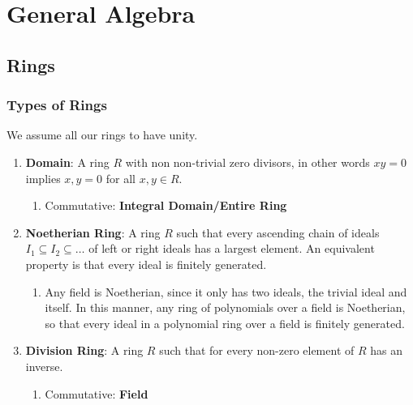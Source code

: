 \documentclass{report}
\begin{document}
  \chapter{General Algebra}
  \section{Rings}
  \subsection{Types of Rings}
  We assume all our rings to have unity.
  \begin{enumerate}
  \item[] \textbf{Domain}: A ring $R$ with non non-trivial zero divisors, in other words $xy=0$ implies $x,y=0$ for all $x,y\in R$.
    \begin{enumerate}
    \item[] Commutative: \textbf{Integral Domain/Entire Ring}
    \end{enumerate}

  \item[] \textbf{Noetherian Ring}: A ring $R$ such that every ascending chain of ideals $I_1\subseteq I_2\subseteq\ldots$ of left or right ideals has a largest element. An equivalent property is that every ideal is finitely generated.
    \begin{enumerate}
    \item Any field is Noetherian, since it only has two ideals, the trivial ideal and itself. In this manner, any ring of polynomials over a field is Noetherian, so that every ideal in a polynomial ring over a field is finitely generated.
    \end{enumerate}

  \item[] \textbf{Division Ring}: A ring $R$ such that for every non-zero element of $R$ has an inverse.
    \begin{enumerate}
    \item[] Commutative: \textbf{Field}
    \end{enumerate}
  \end{enumerate}
\end{document}
